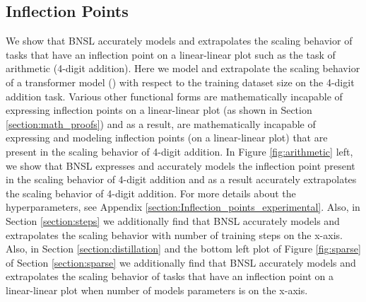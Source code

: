 \documentclass{article} %
\begin{document}
\FloatBarrier

\clearpage

\vspace*{-13.95mm}

\subsection{Inflection Points}
\label{section:Inflection_Points}
\vspace{-2.0275mm}
We show that BNSL accurately models and extrapolates the scaling behavior of tasks that have an inflection point on a linear-linear plot such as the task of arithmetic (4-digit addition). Here we model and extrapolate the scaling behavior of a transformer model (\cite{vaswani2017attention}) with respect to the training dataset size on the 4-digit addition task. Various other functional forms are mathematically incapable of expressing inflection points on a linear-linear plot (as shown in Section \ref{section:math_proofs}) and as a result, are mathematically incapable of expressing and modeling inflection points (on a linear-linear plot) that are present in the scaling behavior of 4-digit addition. In Figure \ref{fig:arithmetic} left, we show that BNSL expresses and accurately models the inflection point present in the scaling behavior of 4-digit addition and as a result accurately extrapolates the scaling behavior of 4-digit addition. For more details about the hyperparameters, see Appendix \ref{section:Inflection_points_experimental}. \vspace{0.1mm} \newline
Also, in Section \ref{section:steps} we additionally find that BNSL accurately models and extrapolates the scaling behavior with number of training
steps on the x-axis. \vspace{0.1mm} \newline
Also, in Section \ref{section:distillation} and the bottom left plot of Figure \ref{fig:sparse} of Section \ref{section:sparse} we additionally find that BNSL accurately models and extrapolates the scaling behavior of tasks that have an inflection point on a linear-linear plot when number of models parameters is on the x-axis.
\end{document}
